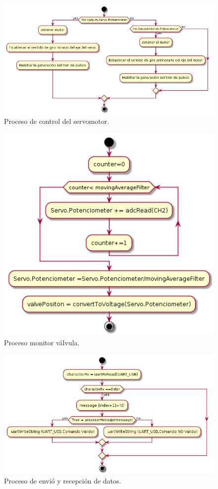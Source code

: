 \begin{figure}
	\centering
	\includegraphics[scale=.55]{./Figures/ProcesoControlServo.png}
	\caption{Proceso de control del servomotor.}
	\label{fig:Control servomotor}
	\end{figure}

 	\begin{figure}
	\centering
	\includegraphics[scale=.65]{./Figures/MonitorValvula.png}
	\caption{Proceso monitor válvula.}
	\label{fig:Proceso monitor valvula}
	\end{figure}

	\begin{figure}
	\centering
	\includegraphics[scale=.65]{./Figures/Porcesorecepcionyenviodedatos.png}
	\caption{Proceso de envió y recepción de datos.}
	\label{fig:Proceso De envió y recepción de datos}
	\end{figure}

